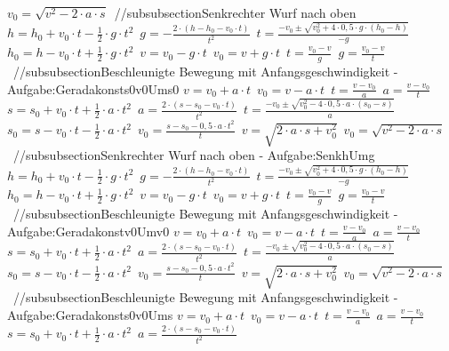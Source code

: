 $ v_{0}  =\sqrt{v^2-2\cdot a \cdot s} $\ 
//subsubsection{Senkrechter Wurf nach oben} 
$ h = h_{0}  + v_{0} \cdot t - \frac{1}{2}\cdot g\cdot t^{2} $\ 
$ g = - \frac{2\cdot (h - h_{0}  - v_{0} \cdot t)}{     t^{2} } $\ 
$ t = \frac{-v_{0}  \pm \sqrt{v_{0} ^{2} +4\cdot 0,5\cdot g\cdot (h_{0}  -h)}}{      -g} $\ 
$ h_{0}  = h - v_{0} \cdot t + \frac{1}{2}\cdot g\cdot t^{2} $\ 
$ v = v_{0}  - g\cdot t $\ 
$ v_{0}  = v + g\cdot t $\ 
$ t = \frac{v_{0} -v}{  g} $\ 
$ g = \frac{v_{0}  - v}{  t} $\ 
//subsubsection{Beschleunigte Bewegung mit Anfangsgeschwindigkeit - Aufgabe:Geradakonsts0v0Ums0} 
$ v = v_{0}  + a\cdot t $\ 
$ v_{0}  = v - a\cdot t $\ 
$ t = \frac{v - v_{0} }{a} $\ 
$ a = \frac{v - v_{0} }{  t} $\ 
$ s = s_{0}  + v_{0} \cdot t + \frac{1}{2}\cdot a\cdot t^{2} $\ 
$ a = \frac{2\cdot (s - s_{0}  - v_{0} \cdot t)}{     t^{2} } $\ 
$ t = \frac{-v_{0}  \pm \sqrt{v_{0} ^{2} -4\cdot 0,5\cdot a\cdot (s_{0}  -s)}}{       a} $\ 
$ s_{0}  = s - v_{0} \cdot t - \frac{1}{2}\cdot a\cdot t^{2} $\ 
$ v_{0}  =\frac{s-s_{0} -0,5\cdot a\cdot t^{2} }{    t} $\ 
$ v  =\sqrt{2\cdot a \cdot s+ v_{0}^2} $\ 
$ v_{0}  =\sqrt{v^2-2\cdot a \cdot s} $\ 
//subsubsection{Senkrechter Wurf nach oben  - Aufgabe:SenkhUmg} 
$ h = h_{0}  + v_{0} \cdot t - \frac{1}{2}\cdot g\cdot t^{2} $\ 
$ g = - \frac{2\cdot (h - h_{0}  - v_{0} \cdot t)}{     t^{2} } $\ 
$ t = \frac{-v_{0}  \pm \sqrt{v_{0} ^{2} +4\cdot 0,5\cdot g\cdot (h_{0}  -h)}}{      -g} $\ 
$ h_{0}  = h - v_{0} \cdot t + \frac{1}{2}\cdot g\cdot t^{2} $\ 
$ v = v_{0}  - g\cdot t $\ 
$ v_{0}  = v + g\cdot t $\ 
$ t = \frac{v_{0} -v}{  g} $\ 
$ g = \frac{v_{0}  - v}{  t} $\ 
//subsubsection{Beschleunigte Bewegung mit Anfangsgeschwindigkeit - Aufgabe:Geradakonstv0Umv0} 
$ v = v_{0}  + a\cdot t $\ 
$ v_{0}  = v - a\cdot t $\ 
$ t = \frac{v - v_{0} }{a} $\ 
$ a = \frac{v - v_{0} }{  t} $\ 
$ s = s_{0}  + v_{0} \cdot t + \frac{1}{2}\cdot a\cdot t^{2} $\ 
$ a = \frac{2\cdot (s - s_{0}  - v_{0} \cdot t)}{     t^{2} } $\ 
$ t = \frac{-v_{0}  \pm \sqrt{v_{0} ^{2} -4\cdot 0,5\cdot a\cdot (s_{0}  -s)}}{       a} $\ 
$ s_{0}  = s - v_{0} \cdot t - \frac{1}{2}\cdot a\cdot t^{2} $\ 
$ v_{0}  =\frac{s-s_{0} -0,5\cdot a\cdot t^{2} }{    t} $\ 
$ v  =\sqrt{2\cdot a \cdot s+ v_{0}^2} $\ 
$ v_{0}  =\sqrt{v^2-2\cdot a \cdot s} $\ 
//subsubsection{Beschleunigte Bewegung mit Anfangsgeschwindigkeit - Aufgabe:Geradakonsts0v0Ums} 
$ v = v_{0}  + a\cdot t $\ 
$ v_{0}  = v - a\cdot t $\ 
$ t = \frac{v - v_{0} }{a} $\ 
$ a = \frac{v - v_{0} }{  t} $\ 
$ s = s_{0}  + v_{0} \cdot t + \frac{1}{2}\cdot a\cdot t^{2} $\ 
$ a = \frac{2\cdot (s - s_{0}  - v_{0} \cdot t)}{     t^{2} } $\ 
